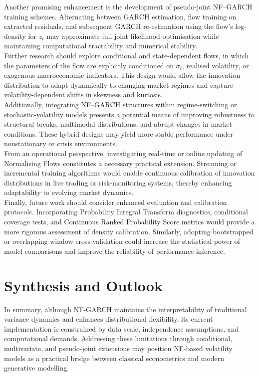 \documentclass[oneside,12pt]{CUEDthesisPSnPDF}
\begin{document}
\medskip
\noindent
Another promising enhancement is the development of pseudo-joint NF–GARCH training schemes. Alternating between GARCH estimation, flow training on extracted residuals, and subsequent GARCH re-estimation using the flow’s log-density for $z_t$ may approximate full joint likelihood optimisation while maintaining computational tractability and numerical stability.\\

\medskip
\noindent
Further research should explore conditional and state-dependent flows, in which the parameters of the flow are explicitly conditioned on $\sigma_t$, realised volatility, or exogenous macroeconomic indicators. This design would allow the innovation distribution to adapt dynamically to changing market regimes and capture volatility-dependent shifts in skewness and kurtosis.\\

\medskip
\noindent
Additionally, integrating NF–GARCH structures within regime-switching or stochastic-volatility models presents a potential means of improving robustness to structural breaks, multimodal distributions, and abrupt changes in market conditions. These hybrid designs may yield more stable performance under nonstationary or crisis environments.\\

\medskip
\noindent
From an operational perspective, investigating real-time or online updating of Normalising Flows constitutes a necessary practical extension. Streaming or incremental training algorithms would enable continuous calibration of innovation distributions in live trading or risk-monitoring systems, thereby enhancing adaptability to evolving market dynamics.\\

\medskip
\noindent
Finally, future work should consider enhanced evaluation and calibration protocols. Incorporating Probability Integral Transform diagnostics, conditional coverage tests, and Continuous Ranked Probability Score metrics would provide a more rigorous assessment of density calibration. Similarly, adopting bootstrapped or overlapping-window cross-validation could increase the statistical power of model comparisons and improve the reliability of performance inference.\\



\section{Synthesis and Outlook}
\noindent
In summary, although NF-GARCH maintains the interpretability of traditional variance dynamics and enhances distributional flexibility, its current implementation is constrained by data scale, independence assumptions, and computational demands. Addressing these limitations through conditional, multivariate, and pseudo-joint extensions may position NF-based volatility models as a practical bridge between classical econometrics and modern generative modelling.\\
\end{document}
